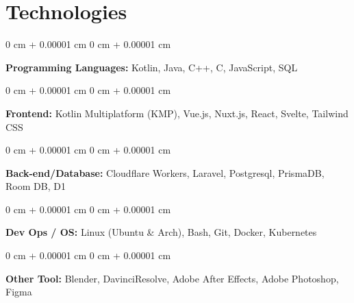 \documentclass[10pt, letterpaper]{article}
\newenvironment{onecolentry}{ \begin{adjustwidth}{ 0 cm + 0.00001 cm }{ 0 cm + 0.00001 cm }
}{ \end{adjustwidth} } %
\begin{document}
  \section{Technologies}
  \begin{onecolentry}
    \textbf{Programming Languages:} Kotlin, Java, C++, C, JavaScript, SQL
  \end{onecolentry}
  \vspace{0.2 cm}
  \begin{onecolentry}
    \textbf{Frontend:} Kotlin Multiplatform (KMP), Vue.js, Nuxt.js, React,
    Svelte, Tailwind CSS
  \end{onecolentry}
  \vspace{0.2 cm}
  \begin{onecolentry}
    \textbf{Back-end/Database:} Cloudflare Workers, Laravel, Postgresql, PrismaDB,
    Room DB, D1
  \end{onecolentry}
  \vspace{0.2 cm}
  \begin{onecolentry}
    \textbf{Dev Ops / OS:} Linux (Ubuntu \& Arch), Bash, Git, Docker, Kubernetes
  \end{onecolentry}
  \vspace{0.2 cm}
  \begin{onecolentry}
    \textbf{Other Tool:} Blender, DavinciResolve, Adobe After Effects, Adobe Photoshop,
    Figma
  \end{onecolentry}
\end{document}
